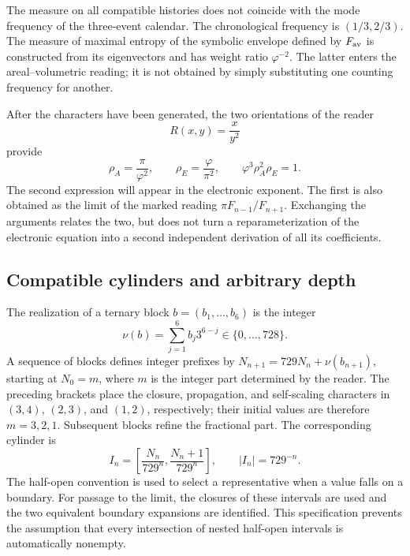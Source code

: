 The measure on all compatible histories does not coincide with the mode frequency of the three-event calendar. The chronological frequency is \((1/3,2/3)\). The measure of maximal entropy of the symbolic envelope defined by \(F_{\rm av}\) is constructed from its eigenvectors and has weight ratio \(\varphi^{-2}\). The latter enters the areal--volumetric reading; it is not obtained by simply substituting one counting frequency for another.




After the characters have been generated, the two orientations of the reader
\[
 R(x,y)=\frac{x}{y^2}
\]
provide
\begin{equation}
 \rho_A=\frac\pi{\varphi^2},\qquad
 \rho_E=\frac\varphi{\pi^2},\qquad
 \varphi^3\rho_A^2\rho_E=1.
 \label{eq:areal-electron}
\end{equation}
The second expression will appear in the electronic exponent. The first is also obtained as the limit of the marked reading \(\pi F_{n-1}/F_{n+1}\). Exchanging the arguments relates the two, but does not turn a reparameterization of the electronic equation into a second independent derivation of all its coefficients.



\subsection{Compatible cylinders and arbitrary depth}

The realization of a ternary block \(b=(b_1,\ldots,b_6)\) is the integer
\[
 \nu(b)=\sum_{j=1}^6b_j3^{6-j}\in\{0,\ldots,728\}.
\]
A sequence of blocks defines integer prefixes by \(N_{n+1}=729N_n+\nu(b_{n+1})\), starting at \(N_0=m\), where \(m\) is the integer part determined by the reader. The preceding brackets place the closure, propagation, and self-scaling characters in \((3,4)\), \((2,3)\), and \((1,2)\), respectively; their initial values are therefore \(m=3,2,1\). Subsequent blocks refine the fractional part. The corresponding cylinder is
\begin{equation}
 I_n=\left[\frac{N_n}{729^n},\frac{N_n+1}{729^n}\right],
 \qquad |I_n|=729^{-n}.
 \label{eq:cilindro}
\end{equation}
The half-open convention is used to select a representative when a value falls on a boundary. For passage to the limit, the closures of these intervals are used and the two equivalent boundary expansions are identified. This specification prevents the assumption that every intersection of nested half-open intervals is automatically nonempty.

